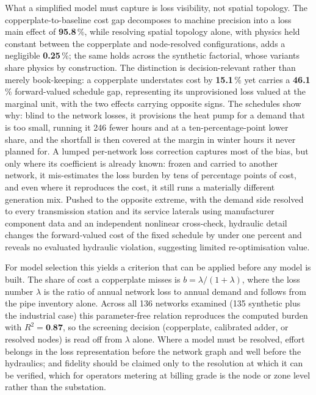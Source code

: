\documentclass[a4paper,fleqn]{cas-sc}
\begin{document}
What a simplified model must capture is loss visibility, not spatial topology. The
copperplate-to-baseline cost gap decomposes to machine precision into a loss main effect of
\textbf{95.8}\,\%, while resolving spatial topology alone, with physics held constant between the
copperplate and node-resolved configurations, adds a negligible \textbf{0.25}\,\%; the same holds
across the synthetic factorial, whose variants share physics by construction. The distinction is
decision-relevant rather than merely book-keeping: a copperplate understates cost by
\textbf{15.1}\,\% yet carries a \textbf{46.1}\,\% forward-valued schedule gap, representing its
unprovisioned loss valued at the marginal unit, with the two effects carrying opposite signs. The
schedules show why: blind to the network losses, it provisions the heat pump for a demand that is
too small, running it 246 fewer hours and at a ten-percentage-point lower share, and the shortfall
is then covered at the margin in winter hours it never planned for. A lumped per-network loss
correction captures most of the bias, but only where its coefficient is already known: frozen and
carried to another network, it mis-estimates the loss burden by tens of percentage points of cost,
and even where it reproduces the cost, it still runs a materially different generation mix.
Pushed to the opposite extreme, with the demand side resolved to every transmission station and
its service laterals using manufacturer component data and an independent nonlinear cross-check,
hydraulic detail changes the forward-valued cost of the fixed schedule by under one percent and reveals no evaluated hydraulic violation, suggesting limited re-optimisation value.

For model selection this yields a criterion that can be applied before any model is built.
The share of cost a copperplate misses is $b = \lambda/(1+\lambda)$, where the loss number
$\lambda$ is the ratio of annual network loss to annual demand and follows from the pipe
inventory alone. Across all 136 networks examined (135 synthetic plus the industrial case)
this parameter-free relation reproduces the computed burden with $R^2 = \textbf{0.87}$, so the
screening decision (copperplate, calibrated adder, or resolved nodes) is read off from
$\lambda$ alone. Where a model must be resolved, effort belongs in the loss representation
before the network graph and well before the hydraulics; and fidelity should be claimed only to
the resolution at which it can be verified, which for operators metering at billing grade is
the node or zone level rather than the substation.
\end{document}
